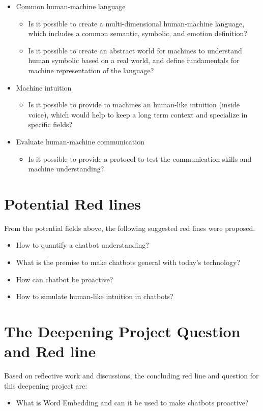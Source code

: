 \begin{itemize}
    \item Common human-machine language
    \begin{itemize}[noitemsep]
        \item Is it possible to create a multi-dimensional human-machine language, which includes a common semantic, symbolic, and emotion definition?
        \item Is it possible to create an abstract world for machines to understand human symbolic based on a real world, and define fundamentals for machine representation of the language?
    \end{itemize}
    \item Machine intuition
    \begin{itemize}[noitemsep]
        \item Is it possible to provide to machines an human-like intuition (inside voice), which would help to keep a long term context and specialize in specific fields?
    \end{itemize}
    \item Evaluate human-machine communication
    \begin{itemize}[noitemsep]
        \item Is it possible to provide a protocol to test the communication skills and machine understanding?
    \end{itemize}
\end{itemize}


\section{Potential Red lines}
From the potential fields above, the following suggested red lines were proposed.

\begin{itemize}[noitemsep]
    \item How to quantify a chatbot understanding?
    \item What is the premise to make chatbots general with today's technology?
    \item How can chatbot be proactive?
    \item How to simulate human-like intuition in chatbots?
\end{itemize}


\section{The Deepening Project Question and Red line}
Based on reflective work and discussions, the concluding red line and question for this deepening project are:

\begin{itemize}[noitemsep]
    \item What is Word Embedding and can it be used to make chatbots proactive?
\end{itemize}
